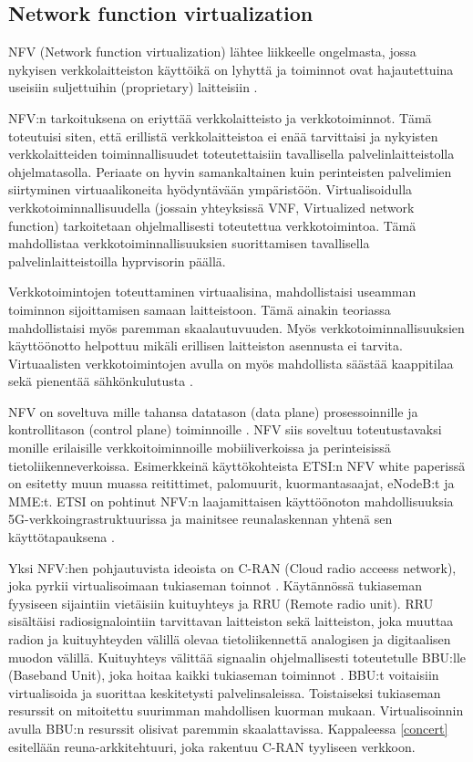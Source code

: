 \subsection{Network function virtualization} \label{nfv}
NFV (Network function virtualization) lähtee liikkeelle ongelmasta, jossa nykyisen verkkolaitteiston käyttöikä on lyhyttä ja toiminnot ovat hajautettuina useisiin suljettuihin (proprietary) laitteisiin \cite{nfvwhite}. 

NFV:n tarkoituksena on eriyttää verkkolaitteisto ja verkkotoiminnot. Tämä toteutuisi siten, että erillistä verkkolaitteistoa ei enää tarvittaisi ja nykyisten verkkolaitteiden toiminnallisuudet toteutettaisiin tavallisella palvelinlaitteistolla ohjelmatasolla. Periaate on hyvin samankaltainen kuin perinteisten palvelimien siirtyminen virtuaalikoneita hyödyntävään ympäristöön.
Virtualisoidulla verkkotoiminnallisuudella (jossain yhteyksissä VNF, Virtualized network function) tarkoitetaan ohjelmallisesti toteutettua verkkotoimintoa. Tämä mahdollistaa verkkotoiminnallisuuksien suorittamisen tavallisella palvelinlaitteistoilla hyprvisorin päällä. 

Verkkotoimintojen toteuttaminen virtuaalisina, mahdollistaisi useamman toiminnon sijoittamisen samaan laitteistoon. Tämä ainakin teoriassa mahdollistaisi myös paremman skaalautuvuuden. Myös verkkotoiminnallisuuksien käyttöönotto helpottuu mikäli erillisen laitteiston asennusta ei tarvita. Virtuaalisten verkkotoimintojen avulla on myös mahdollista säästää kaappitilaa sekä pienentää sähkönkulutusta \cite{nfvedge}.

NFV on soveltuva mille tahansa datatason (data plane) prosessoinnille ja kontrollitason (control plane) toiminnoille \cite{nfvwhite}. NFV siis soveltuu toteutustavaksi monille erilaisille verkkoitoiminnoille mobiiliverkoissa ja perinteisissä tietoliikenneverkoissa. Esimerkkeinä käyttökohteista ETSI:n NFV white paperissä on esitetty muun muassa reitittimet, palomuurit, kuormantasaajat, eNodeB:t ja MME:t. ETSI on pohtinut NFV:n laajamittaisen käyttöönoton mahdollisuuksia 5G-verkkoingrastruktuurissa ja mainitsee reunalaskennan yhtenä sen käyttötapauksena \cite{etsinfv5g}.

Yksi NFV:hen pohjautuvista ideoista on C-RAN (Cloud radio acceess network), joka pyrkii virtualisoimaan tukiaseman toinnot \cite{chih2014recent}. Käytännössä tukiaseman fyysiseen sijaintiin vietäisiin kuituyhteys ja RRU (Remote radio unit).
RRU sisältäisi radiosignalointiin tarvittavan laitteiston sekä laitteiston, joka muuttaa radion ja kuituyhteyden välillä olevaa tietoliikennettä analogisen ja digitaalisen muodon välillä.
Kuituyhteys välittää signaalin ohjelmallisesti toteutetulle BBU:lle (Baseband Unit), joka hoitaa kaikki tukiaseman toiminnot \cite{chih2014recent}.
BBU:t voitaisiin virtualisoida ja suorittaa keskitetysti palvelinsaleissa.
Toistaiseksi tukiaseman resurssit on mitoitettu suurimman mahdollisen kuorman mukaan. Virtualisoinnin avulla BBU:n resurssit olisivat paremmin skaalattavissa.
Kappaleessa \ref{concert} esitellään reuna-arkkitehtuuri, joka rakentuu C-RAN tyyliseen verkkoon.

